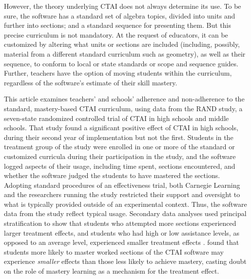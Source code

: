 \documentclass[notitlepage,12pt]{jedm}\usepackage[]{graphicx}\usepackage[]{color}
\begin{document}
However, the theory underlying CTAI does not always determine its
use. To be sure, the software has a standard set of algebra topics,
divided into units and further into sections; and a standard sequence
for presenting them. But this precise curriculum is not mandatory. At
the request of educators, it can be customized by altering what units
or sections are included (including, possibly, material from a
different standard curriculum such as geometry), as well as their
sequence, to conform to local or state standards or scope and sequence
guides. Further, teachers have the option of moving students within
the curriculum, regardless of the software's estimate of their skill
mastery.

This article examines teachers' and schools' adherence and
non-adherence to the standard, mastery-based CTAI curriculum, using
data from the RAND study, a seven-state randomized controlled trial of
CTAI in high schools and middle schools. That study found a significant
positive effect of CTAI in high schools, during their second year of
implementation but not the first. Students in the treatment group of
the study were enrolled in one or more of the standard or customized
curricula during their participation in the study, and the software
logged aspects of their usage, including time spent, sections
encountered, and whether the software judged the students to have
mastered the sections. Adopting standard procedures of an
effectiveness trial, both Carnegie Learning and the researchers
running the study restricted their support and oversight to what is
typically provided outside of an experimental context. Thus, the
software data from the study reflect typical usage. Secondary data analyses used principal stratification to show that students who attempted more sections experienced larger treatment effects, and students who had high or low assistance levels, as opposed to an average level, experienced smaller treatment effects \cite{sales2015exploring,sales2016student}.
 found that students more likely to master worked
sections of the CTAI software may experience \emph{smaller} effects
than those less likely to achieve mastery, casting doubt on the role
of mastery learning as a mechanism for the treatment effect.
\end{document}
